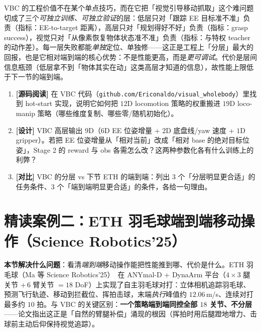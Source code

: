 \begin{insight}\label{ins:rlmc-lm-vbc-layers}
VBC 的工程价值不在某个单点技巧，而在它把「视觉引导移动抓取」这个难问题切成了三个\emph{可独立训练、可独立验证}的层：低层只对「跟踪 EE 目标准不准」负责（指标：EE-to-target 距离），高层只对「规划得好不好」负责（指标：grasp success），视觉只对「从像素恢复物体状态准不准」负责（指标：与特权 teacher 的动作差）。每一层失败都能\emph{单独}定位、单独修——这正是工程上「分层」最大的回报，也是它相对端到端的核心优势：不是性能更高，而是\emph{更可调试}。代价是层间信息瓶颈（低层拿不到「物体其实在动」这类高层才知道的信息），故性能上限低于下一节的端到端。
\end{insight}

\begin{practice}[练习·VBC 精读]
\begin{enumerate}
\item \textbf{[源码阅读]} 在 VBC 代码（\verb|github.com/Ericonaldo/visual_wholebody|）里找到 hot-start 实现，说明它如何把 $12$D locomotion 策略的权重搬进 $19$D loco-manip 策略（哪些维度复制、哪些零/随机初始化）。
\item \textbf{[设计]} VBC 高层输出 $9$D（$6$D EE 位姿增量 + $2$D 底盘线/yaw 速度 + $1$D gripper）。若把 EE 位姿增量从「相对当前」改成「相对 base 的绝对目标位姿」，Stage 2 的 reward 与 obs 各需怎么改？这两种参数化各有什么训练上的利弊？
\item \textbf{[对比]} VBC 的分层 vs 下节 ETH 的端到端：列出 $3$ 个「分层明显更合适」的任务条件、$3$ 个「端到端明显更合适」的条件，各给一句理由。
\end{enumerate}
\end{practice}

\section{精读案例二：ETH 羽毛球端到端移动操作（Science Robotics'25）}
\label{sec:rlmc-lm-eth}

\textbf{本节解决什么问题}：看清\emph{端到端}移动操作能把性能推到哪、代价是什么。ETH 羽毛球（Ma 等 Science Robotics'25）\,\cite{ma2025badminton} 在 ANYmal-D + DynaArm 平台（$4\times3$ 腿关节 $+\,6$ 臂关节 $=18$ DoF）上实现了自主羽毛球对打：立体相机追踪羽毛球、预测飞行轨迹、移动到拦截位、挥拍击球，末端\emph{执行}峰值约 $12.06\,$m/s、连续对打最多约 $10$ 拍。与 VBC 的关键区别：\textbf{一个策略端到端同控全部 $18$ 关节、不分层}——论文指出这正是「自然的臂腿补偿」涌现的根因（挥拍时用后腿蹬地增力、击球前主动后仰保持视觉追踪）。

